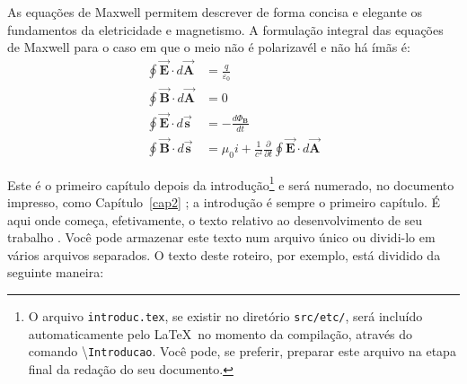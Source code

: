 %
%
%
%
%
%
%
%
%
%
%
%

As equações de Maxwell permitem descrever de forma concisa e elegante
os fundamentos da eletricidade e magnetismo. A formulação integral das
equações de Maxwell para o caso em que o meio não é polarizavél e não há ímãs é:%
\begin{align}
\oint\overrightarrow{\mathbf{E}}\cdot d\overrightarrow{\mathbf{A}}  &
=\frac{q}{\varepsilon_{0}}\\
\oint\overrightarrow{\mathbf{B}}\cdot d\overrightarrow{\mathbf{A}}  & =0\\
\oint\overrightarrow{\mathbf{E}}\cdot d\overrightarrow{\mathbf{s}}  &
=-\frac{d\Phi_{\mathbf{B}}}{dt}\\
\oint\overrightarrow{\mathbf{B}}\cdot d\overrightarrow{\mathbf{s}}  & =\mu
_{0}i+\frac{1}{c^{2}}\frac{\partial}{\partial t}\oint\overrightarrow
{\mathbf{E}}\cdot d\overrightarrow{\mathbf{A}}
\end{align}
%



Este é o primeiro capítulo depois da introdução\footnote[2]{O arquivo \texttt{introduc.tex}, se existir no diret\'{o}rio \texttt{src/etc/}, será incluído automaticamente pelo \LaTeX \ no momento da compilação, através do comando \textbackslash\texttt{Introducao}. Você pode, se preferir, preparar este arquivo na etapa final da redação do seu documento.} e será numerado, no documento impresso, como Capítulo~\ref{cap2} \cite{taylor}; a introdução é sempre o primeiro capítulo. É aqui onde começa, efetivamente, o texto relativo ao desenvolvimento de seu trabalho \cite{etex}. Você pode armazenar este texto num arquivo único ou dividi-lo em
vários arquivos separados. O texto deste roteiro, por exemplo,
está dividido da seguinte maneira:

